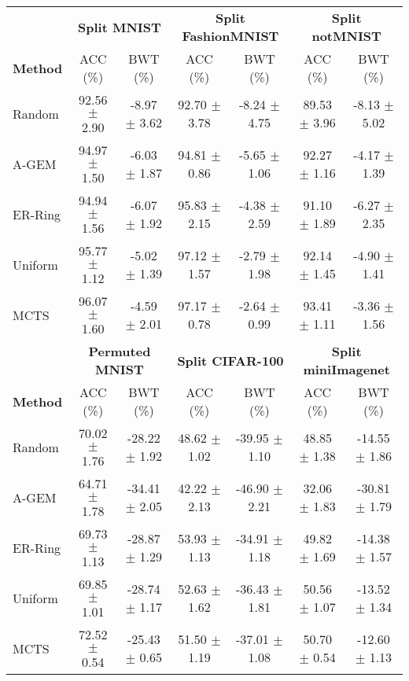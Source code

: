 \begin{tabular}{lcccccc}
	\toprule
	& \multicolumn{2}{c}{\textbf{Split MNIST}} & \multicolumn{2}{c}{\textbf{Split FashionMNIST}} & \multicolumn{2}{c}{\textbf{Split notMNIST}} \\ 
	\cmidrule(lr){2-3} \cmidrule(lr){4-5} \cmidrule(lr){6-7} 
	\textbf{Method} & ACC (\%)            & BWT (\%)           & ACC (\%)               & BWT (\%)               & ACC (\%)             & BWT (\%)             \\ \midrule
	Random          & 92.56 $\pm$ 2.90      & -8.97 $\pm$ 3.62     & 92.70 $\pm$ 3.78         & -8.24 $\pm$ 4.75         & 89.53 $\pm$ 3.96       & -8.13 $\pm$ 5.02       \\
	A-GEM           & 94.97 $\pm$ 1.50      & -6.03 $\pm$ 1.87     & 94.81 $\pm$ 0.86         & -5.65 $\pm$ 1.06         & 92.27 $\pm$ 1.16       & -4.17 $\pm$ 1.39       \\
	ER-Ring         & 94.94 $\pm$ 1.56      & -6.07 $\pm$ 1.92     & 95.83 $\pm$ 2.15         & -4.38 $\pm$ 2.59         & 91.10 $\pm$ 1.89       & -6.27 $\pm$ 2.35       \\
	Uniform      & 95.77 $\pm$ 1.12      & -5.02 $\pm$ 1.39     & 97.12 $\pm$ 1.57         & -2.79 $\pm$ 1.98         & 92.14 $\pm$ 1.45       & -4.90 $\pm$ 1.41       \\
	MCTS            & 96.07 $\pm$ 1.60      & -4.59 $\pm$ 2.01     & 97.17 $\pm$ 0.78         & -2.64 $\pm$ 0.99         & 93.41 $\pm$ 1.11       & -3.36 $\pm$ 1.56      \\ \bottomrule \toprule
	& \multicolumn{2}{c}{\textbf{Permuted MNIST}} & \multicolumn{2}{c}{\textbf{Split CIFAR-100}} & \multicolumn{2}{c}{\textbf{Split miniImagenet}} \\ 
	\cmidrule(lr){2-3} \cmidrule(lr){4-5} \cmidrule(lr){6-7} 
	\textbf{Method} & ACC (\%)             & BWT (\%)             & ACC (\%)             & BWT (\%)              & ACC (\%)               & BWT (\%)               \\ \midrule
	Random          & 70.02 $\pm$ 1.76       & -28.22 $\pm$ 1.92      & 48.62 $\pm$ 1.02       & -39.95 $\pm$ 1.10       & 48.85 $\pm$ 1.38         & -14.55 $\pm$ 1.86        \\
	A-GEM           & 64.71 $\pm$ 1.78       & -34.41 $\pm$ 2.05      & 42.22 $\pm$ 2.13       & -46.90 $\pm$ 2.21       & 32.06 $\pm$ 1.83         & -30.81 $\pm$ 1.79        \\
	ER-Ring         & 69.73 $\pm$ 1.13       & -28.87 $\pm$ 1.29      & 53.93 $\pm$ 1.13       & -34.91 $\pm$ 1.18       & 49.82 $\pm$ 1.69         & -14.38 $\pm$ 1.57        \\
	Uniform      & 69.85 $\pm$ 1.01       & -28.74 $\pm$ 1.17      & 52.63 $\pm$ 1.62       & -36.43 $\pm$ 1.81       & 50.56 $\pm$ 1.07         & -13.52 $\pm$ 1.34        \\
	MCTS            & 72.52 $\pm$ 0.54       & -25.43 $\pm$ 0.65      & 51.50 $\pm$ 1.19       & -37.01 $\pm$ 1.08       & 50.70 $\pm$ 0.54         & -12.60 $\pm$ 1.13       \\ \bottomrule
\end{tabular}